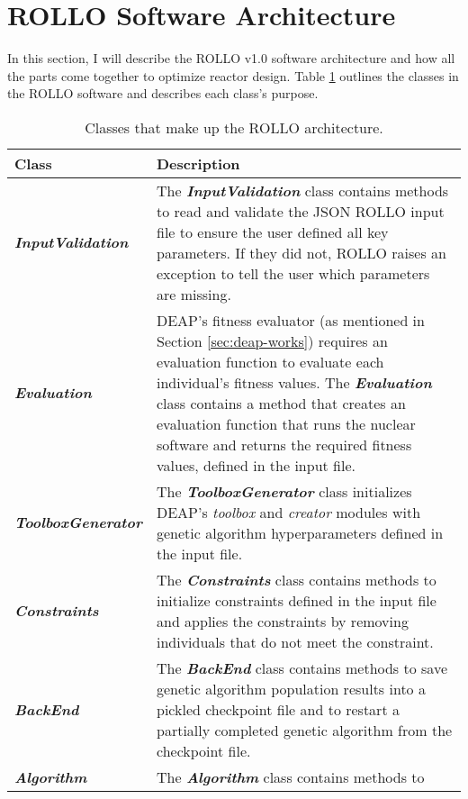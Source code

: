 \section{ROLLO Software Architecture}
In this section, I will describe the \gls{ROLLO} v1.0 software architecture and 
how all the parts come together to optimize reactor design.
Table \ref{tab:rollo-architecture} outlines the classes in the \gls{ROLLO} software 
and describes each class's purpose.
\begin{table}[]
    \centering
    \onehalfspacing
    \caption{Classes that make up the \gls{ROLLO} architecture. }
	\label{tab:rollo-architecture}
    \footnotesize
    \begin{tabular}{l|p{}}
    \hline
    \textbf{Class} & \textbf{Description} \\ \hline
    \textbf{\textit{InputValidation}} & The \textbf{\textit{InputValidation}} class contains methods 
    to read and validate the JSON \gls{ROLLO} input file to 
    ensure the user defined all key parameters. If they did not, \gls{ROLLO} 
    raises an exception to tell the user which parameters are missing. \\
    \hline
    \textbf{\textit{Evaluation}} & \gls{DEAP}'s fitness evaluator (as mentioned in Section 
    \ref{sec:deap-works}) requires an evaluation function to evaluate each 
    individual's fitness values. 
    The \textbf{\textit{Evaluation}} class contains a method that creates an evaluation 
    function that runs the nuclear software and returns the required fitness values, 
    defined in the input file. \\
    \hline 
    \textbf{\textit{ToolboxGenerator}} & The \textbf{\textit{ToolboxGenerator}} class initializes
    \gls{DEAP}'s \textit{toolbox} and \textit{creator} modules with genetic algorithm 
    hyperparameters defined in the input file.\\
    \hline
    \textbf{\textit{Constraints}} & The \textbf{\textit{Constraints}} class 
    contains methods to initialize constraints defined in the input file 
    and applies the constraints by removing individuals that do not meet the 
    constraint.\\
    \hline 
    \textbf{\textit{BackEnd}} & The \textbf{\textit{BackEnd}} class contains methods to save 
    genetic algorithm population results into a pickled checkpoint file and to 
    restart a partially completed genetic algorithm from the checkpoint file. \\
    \hline
    \textbf{\textit{Algorithm}} & The \textbf{\textit{Algorithm}} class contains methods to 

\end{tabular}
\end{table}
